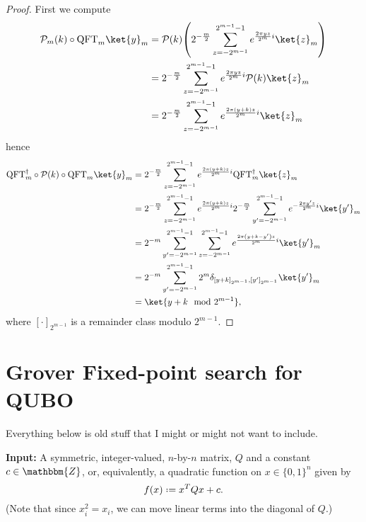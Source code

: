 \documentclass[reqno,oneside,12pt]{amsart}  %
\numberwithin{equation}{section}                %
\let\originalleft\left
\let\originalright\right
\renewcommand{\left}{\mathopen{}\mathclose\bgroup\originalleft}
\renewcommand{\right}{\aftergroup\egroup\originalright}
\def\({\mathopen{}\left(}
\def\){\right)\mathclose{}}
\newcommand*{\eqdef}{\mathrel{\vcenter{\baselineskip0.5ex \lineskiplimit0pt\hbox{.}\hbox{.}}}=}
\def\Z{\mathbbm{Z}}
\def\cP{\mathcal{P}}
\def\QFT{\mathrm{QFT}}
\begin{document}
\begin{proof}
   First we compute
   \begin{align}
      \cP_m \( k \) \circ \QFT_m \ket{y}_m  &= \cP \( k \) \( 2^{- \frac{m}{2}} \sum\limits_{z = - 2^{m - 1}}^{2^{m - 1} - 1} e^{\frac{2 \pi y z}{2^m} i} \ket{z}_m \) \\
         &= 2^{- \frac{m}{2}} \sum\limits_{z = - 2^{m - 1}}^{2^{m - 1} - 1} e^{\frac{2 \pi y z}{2^m} i} \cP \( k \) \ket{z}_m \\
         &= 2^{- \frac{m}{2}} \sum\limits_{z = - 2^{m - 1}}^{2^{m - 1} - 1} e^{\frac{2 \pi \( y + k \) z}{2^m} i} \ket{z}_m
   \end{align}
   hence
   \begin{align}
      \QFT_m^\dagger \circ \cP \( k \) \circ \QFT_m \ket{y}_m  &= 2^{- \frac{m}{2}} \sum\limits_{z = - 2^{m - 1}}^{2^{m - 1} - 1} e^{\frac{2 \pi \( y + k \) z}{2^m} i} \QFT_m^\dagger \ket{z}_m \\
         &= 2^{- \frac{m}{2}} \sum\limits_{z = - 2^{m - 1}}^{2^{m - 1} - 1} e^{\frac{2 \pi \( y + k \) z}{2^m} i} 2^{- \frac{m}{2}} \sum\limits_{y^\prime = - 2^{m - 1}}^{2^{m - 1} - 1} e^{- \frac{2 \pi y^\prime z}{2^m} i} \ket{y^\prime}_m \\
         &= 2^{- m} \sum\limits_{y^\prime = - 2^{m - 1}}^{2^{m - 1} - 1} \sum\limits_{z = - 2^{m - 1}}^{2^{m - 1} - 1} e^{\frac{2 \pi \( y + k - y^\prime \) z}{2^m} i} \ket{y^\prime}_m \\
         &= 2^{- m} \sum\limits_{y^\prime = - 2^{m - 1}}^{2^{m - 1} - 1} 2^m \delta_{[y + k]_{2^{m - 1}}, [y^\prime]_{2^{m - 1}}} \ket{y^\prime}_m \\
         &= \ket{y + k \mod 2^{m - 1}},
   \end{align}
   where $[ \cdot ]_{2^{m - 1}}$ is a remainder class modulo $2^{m - 1}$.
\end{proof}

\bigskip

\section{Grover Fixed-point search for QUBO}
\label{sec:grover_for_qubo}

\newpage

{\color{red} Everything below is old stuff that I might or might not want to include.}

\noindent\textbf{Input:} A symmetric, integer-valued, $n$-by-$n$ matrix, $Q$ and a constant $c \in \Z$, or, equivalently, a quadratic function on $x \in \{ 0, 1 \}^n$ given by
\begin{equation}
   f (x) \eqdef x^T Q x + c. \label{eq:QUBO}
\end{equation}
(Note that since $x_i^2 = x_i$, we can move linear terms into the diagonal of $Q$.)
\end{document}
